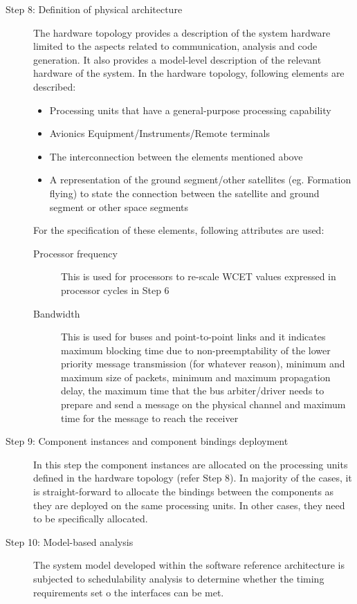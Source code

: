 \begin{description}
\item [Step 8: Definition of physical architecture] The hardware topology provides a description of the system hardware limited to the aspects related to communication, analysis and code generation. It also provides a model-level description of the relevant hardware of the system. In the hardware topology, following elements are described:
\begin{itemize}
\item Processing units that have a general-purpose processing capability
\item Avionics Equipment/Instruments/Remote terminals
\item The interconnection between the elements mentioned above 
\item A representation of the ground segment/other satellites (eg. Formation flying) to state the connection between the satellite and ground segment or other space segments
\end{itemize}		
For the specification of these elements, following attributes are used:
\begin{description}
\item [Processor frequency] This is used for processors to re-scale WCET values expressed in processor cycles in Step 6
\item [Bandwidth] This is used for buses and point-to-point links and it indicates maximum blocking time due to non-preemptability of the lower priority message transmission (for whatever reason), minimum and maximum size of packets, minimum and maximum propagation delay, the maximum time that the bus arbiter/driver needs to prepare and send a message on the physical channel and maximum time for the message to reach the receiver    
\end{description}

\item [Step 9: Component instances and component bindings deployment] In this step the component instances are allocated on the processing units defined in the hardware topology (refer Step 8). In majority of the cases, it is straight-forward to allocate the bindings between the components as they are deployed on the same processing units. In other cases, they need to be specifically allocated.

\item [Step 10: Model-based analysis] The system model developed within the software reference architecture is subjected to schedulability analysis to determine whether the timing requirements set o the interfaces can be met.


\end{description}
